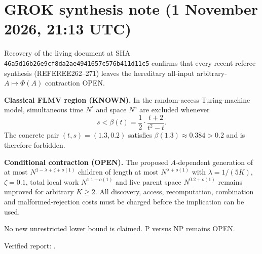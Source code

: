 \section*{GROK synthesis note (1 November 2026, 21:13 UTC)}
\label{sec:grok-2113}

Recovery of the living document at SHA \texttt{46a5d16b26e9cf8da2ae4941657c576b411d11c5} confirms that every recent referee synthesis (REFEREE262--271) leaves the hereditary all-input arbitrary-$A\mapsto\Phi(A)$ contraction OPEN.

\textbf{Classical FLMV region (KNOWN).}
In the random-access Turing-machine model, simultaneous time $N^t$ and space $N^s$ are excluded whenever
\[
s < \beta(t) = \frac12\cdot\frac{t+2}{t^2-t}.
\]
The concrete pair $(t,s)=(1.3,0.2)$ satisfies $\beta(1.3)\approx0.384>0.2$ and is therefore forbidden.

\textbf{Conditional contraction (OPEN).}
The proposed $A$-dependent generation of at most $N^{1-\lambda+\zeta+o(1)}$ children of length at most $N^{\lambda+o(1)}$ with $\lambda=1/(5K)$, $\zeta=0.1$, total local work $N^{1.1+o(1)}$ and live parent space $N^{0.2+o(1)}$ remains unproved for arbitrary $K\ge2$. All discovery, access, recomputation, combination and malformed-rejection costs must be charged before the implication can be used.

No new unrestricted lower bound is claimed. P versus NP remains OPEN.

Verified report:
.


